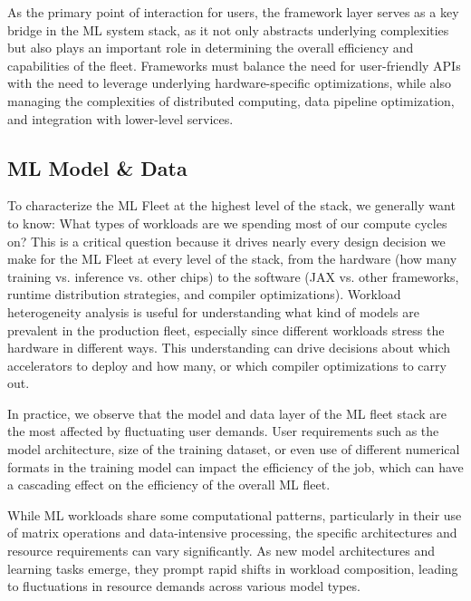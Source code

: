As the primary point of interaction for users, the framework layer serves as a key bridge in the ML system stack, as it not only abstracts underlying complexities but also plays an important role in determining the overall efficiency and capabilities of the fleet. Frameworks must balance the need for user-friendly APIs with the need to leverage underlying hardware-specific optimizations, while also managing the complexities of distributed computing, data pipeline optimization, and integration with lower-level services. 









\subsection{ML Model \& Data}

To characterize the ML Fleet at the highest level of the stack, we generally want to know: What types of workloads are we spending most of our compute cycles on? This is a critical question because it drives nearly every design decision we make for the ML Fleet at every level of the stack, from the hardware (how many training vs. inference vs. other chips) to the software (JAX vs. other frameworks, runtime distribution strategies, and compiler optimizations). Workload heterogeneity analysis is useful for understanding what kind of models are prevalent in the production fleet, especially since different workloads stress the hardware in different ways. This understanding can drive decisions about which accelerators to deploy and how many, or which compiler optimizations to carry out.







In practice, we observe that the model and data layer of the ML fleet stack are the most affected by fluctuating user demands. User requirements such as the model architecture, size of the training dataset, or even use of different numerical formats in the training model can impact the efficiency of the job, which can have a cascading effect on the efficiency of the overall ML fleet.

While ML workloads share some computational patterns, particularly in their use of matrix operations and data-intensive processing, the specific architectures and resource requirements can vary significantly.  As new model architectures and learning tasks emerge, they prompt rapid shifts in workload composition, leading to fluctuations in resource demands across various model types. 

